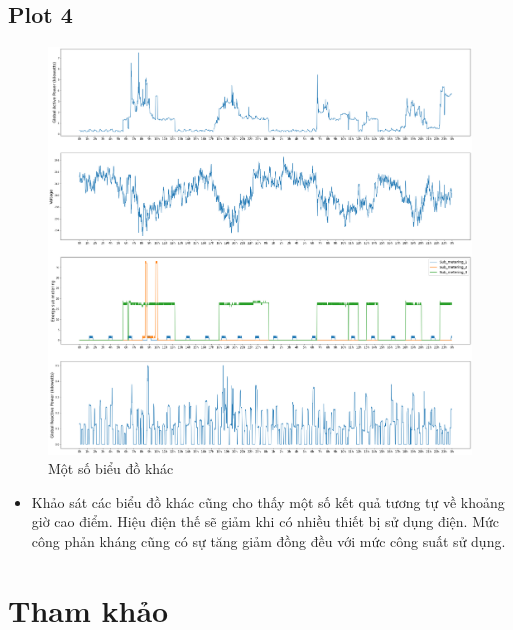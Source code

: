 \documentclass[a4paper, 12pt]{article}
\begin{document}
    \subsection{Plot 4}
        \begin{figure}[H]
            \centering
            \includegraphics[scale=0.3]{img/all.png}
            \caption{Một số biểu đồ khác}
        \end{figure}
        
        \begin{itemize}
            \item Khảo sát các biểu đồ khác cũng cho thấy một số kết quả tương tự về khoảng giờ cao điểm. Hiệu điện thế sẽ giảm khi có nhiều thiết bị sử dụng điện. Mức công phản kháng cũng có sự tăng giảm đồng đều với mức công suất sử dụng.
        \end{itemize}

\clearpage

\section{Tham khảo}
\end{document}
